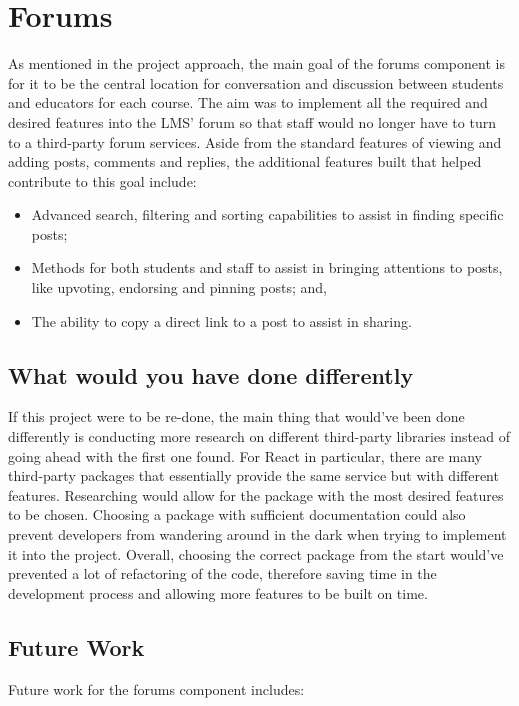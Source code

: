 \section{Forums}

As mentioned in the project approach, the main goal of the forums component is for it to be the central location for conversation and discussion between students and educators for each course.
The aim was to implement all the required and desired features into the LMS' forum so that staff would no longer have to turn to a third-party forum services.
Aside from the standard features of viewing and adding posts, comments and replies, the additional features built that helped contribute to this goal include:

\begin{itemize}
    \item Advanced search, filtering and sorting capabilities to assist in finding specific posts;
    \item Methods for both students and staff to assist in bringing attentions to posts, like upvoting, endorsing and pinning posts; and,
    \item The ability to copy a direct link to a post to assist in sharing.
\end{itemize}

\subsection{What would you have done differently}

If this project were to be re-done, the main thing that would've been done differently is conducting more research on different third-party libraries instead of going ahead with the first one found.
For React in particular, there are many third-party packages that essentially provide the same service but with different features.
Researching would allow for the package with the most desired features to be chosen.
Choosing a package with sufficient documentation could also prevent developers from wandering around in the dark when trying to implement it into the project.
Overall, choosing the correct package from the start would've prevented a lot of refactoring of the code, therefore saving time in the development process and allowing more features to be built on time.

\subsection{Future Work}
Future work for the forums component includes:

